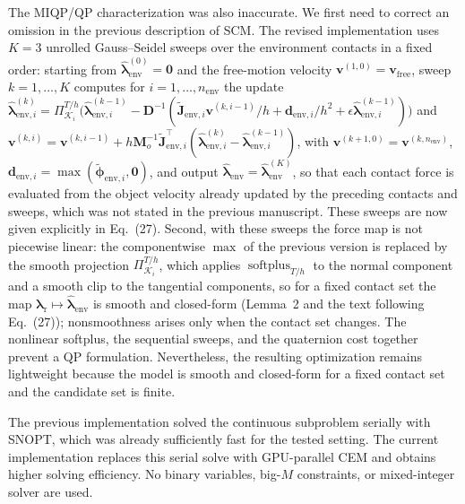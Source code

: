 \documentclass[journal,10pt]{IEEEtran}
\begin{document}
The MIQP/QP characterization was also inaccurate. We first need to correct an omission in the previous description of SCM. The revised implementation uses $K=3$ unrolled Gauss--Seidel sweeps over the environment contacts in a fixed order: starting from $\hat{\boldsymbol{\lambda}}^{(0)}_{\mathrm{env}}=\boldsymbol{0}$ and the free-motion velocity $\boldsymbol{v}^{(1,0)}=\boldsymbol{v}_{\mathrm{free}}$, sweep $k=1,\dots,K$ computes for $i=1,\dots,n_{\mathrm{env}}$ the update $\hat{\boldsymbol{\lambda}}^{(k)}_{\mathrm{env},i}=\Pi^{T/h}_{\mathcal{K}_i}\bigl(\hat{\boldsymbol{\lambda}}^{(k-1)}_{\mathrm{env},i}-\boldsymbol{D}^{-1}(\tilde{\boldsymbol{J}}_{\mathrm{env},i}\boldsymbol{v}^{(k,i-1)}/h+\boldsymbol{d}_{\mathrm{env},i}/h^2+\epsilon\hat{\boldsymbol{\lambda}}^{(k-1)}_{\mathrm{env},i})\bigr)$ and $\boldsymbol{v}^{(k,i)}=\boldsymbol{v}^{(k,i-1)}+h\boldsymbol{M}_o^{-1}\tilde{\boldsymbol{J}}_{\mathrm{env},i}^{\top}(\hat{\boldsymbol{\lambda}}^{(k)}_{\mathrm{env},i}-\hat{\boldsymbol{\lambda}}^{(k-1)}_{\mathrm{env},i})$, with $\boldsymbol{v}^{(k+1,0)}=\boldsymbol{v}^{(k,n_{\mathrm{env}})}$, $\boldsymbol{d}_{\mathrm{env},i}=\max(\tilde{\boldsymbol{\phi}}_{\mathrm{env},i},\boldsymbol{0})$, and output $\hat{\boldsymbol{\lambda}}_{\mathrm{env}}=\hat{\boldsymbol{\lambda}}_{\mathrm{env}}^{(K)}$, so that each contact force is evaluated from the object velocity already updated by the preceding contacts and sweeps, which was not stated in the previous manuscript. These sweeps are now given explicitly in Eq.~(27). Second, with these sweeps the force map is not piecewise linear: the componentwise $\max$ of the previous version is replaced by the smooth projection $\Pi^{T/h}_{\mathcal{K}_i}$, which applies $\operatorname{softplus}_{T/h}$ to the normal component and a smooth clip to the tangential components, so for a fixed contact set the map $\boldsymbol{\lambda}_{\mathrm{r}}\mapsto\hat{\boldsymbol{\lambda}}_{\mathrm{env}}$ is smooth and closed-form (Lemma~2 and the text following Eq.~(27)); nonsmoothness arises only when the contact set changes. The nonlinear softplus, the sequential sweeps, and the quaternion cost together prevent a QP formulation. Nevertheless, the resulting optimization remains lightweight because the model is smooth and closed-form for a fixed contact set and the candidate set is finite.

The previous implementation solved the continuous subproblem serially with SNOPT, which was already sufficiently fast for the tested setting. The current implementation replaces this serial solve with GPU-parallel CEM and obtains higher solving efficiency. No binary variables, big-$M$ constraints, or mixed-integer solver are used.
\end{document}

